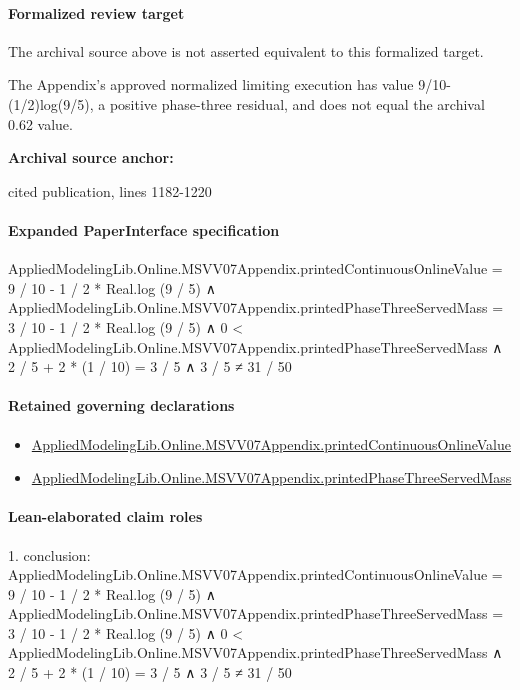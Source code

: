 \documentclass[10pt]{article}
\begin{document}
\paragraph{Formalized review target}
The archival source above is not asserted equivalent to this formalized target.
\begin{ReviewVerbatim}
The Appendix's approved normalized limiting execution has value 9/10-(1/2)log(9/5), a positive phase-three residual, and does not equal the archival 0.62 value.
\end{ReviewVerbatim}

\textbf{Archival source anchor:} {\footnotesize\raggedright cited publication, lines 1182-\allowbreak{}1220\par}
\paragraph{Expanded PaperInterface specification}
\begin{ReviewVerbatim}
AppliedModelingLib.Online.MSVV07Appendix.printedContinuousOnlineValue = 9 / 10 - 1 / 2 * Real.log (9 / 5) ∧
  AppliedModelingLib.Online.MSVV07Appendix.printedPhaseThreeServedMass = 3 / 10 - 1 / 2 * Real.log (9 / 5) ∧
    0 < AppliedModelingLib.Online.MSVV07Appendix.printedPhaseThreeServedMass ∧
      2 / 5 + 2 * (1 / 10) = 3 / 5 ∧ 3 / 5 ≠ 31 / 50
\end{ReviewVerbatim}

\paragraph{Retained governing declarations}
\begin{itemize}\raggedright
\item \hyperlink{governing-declaration-59635b003cd74cb6}{Applied\allowbreak{}Modeling\allowbreak{}Lib.\allowbreak{}Online.\allowbreak{}MSVV07\allowbreak{}Appendix.\allowbreak{}printed\allowbreak{}Continuous\allowbreak{}Online\allowbreak{}Value}
\item \hyperlink{governing-declaration-5ef00eaf9ee9597b}{Applied\allowbreak{}Modeling\allowbreak{}Lib.\allowbreak{}Online.\allowbreak{}MSVV07\allowbreak{}Appendix.\allowbreak{}printed\allowbreak{}Phase\allowbreak{}Three\allowbreak{}Served\allowbreak{}Mass}
\end{itemize}
\paragraph{Lean-elaborated claim roles}\begin{ReviewVerbatim}
1. conclusion: AppliedModelingLib.Online.MSVV07Appendix.printedContinuousOnlineValue = 9 / 10 - 1 / 2 * Real.log (9 / 5) ∧
  AppliedModelingLib.Online.MSVV07Appendix.printedPhaseThreeServedMass = 3 / 10 - 1 / 2 * Real.log (9 / 5) ∧
    0 < AppliedModelingLib.Online.MSVV07Appendix.printedPhaseThreeServedMass ∧
      2 / 5 + 2 * (1 / 10) = 3 / 5 ∧ 3 / 5 ≠ 31 / 50
\end{ReviewVerbatim}
\end{document}
